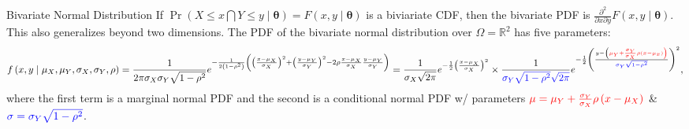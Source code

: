 \documentclass[
  ignorenonframetext,
]{beamer}
\begin{document}
\begin{frame}{Bivariate Normal Distribution}
\protect\hypertarget{bivariate-normal-distribution}{}
If
\(\Pr\left(X \leq x \bigcap Y \leq y \mid \boldsymbol{\theta}\right) = F\left(x,y\mid\boldsymbol{\theta}\right)\)
is a biviariate CDF, then the bivariate PDF is
\(\frac{\partial^2}{\partial x \partial y}F\left(x,y\mid\boldsymbol{\theta}\right)\).
This also generalizes beyond two dimensions. The PDF of the bivariate
normal distribution over \(\Omega = \mathbb{R}^2\) has five parameters:
\[f\left(x,y\mid \mu_X,\mu_Y,\sigma_X,\sigma_Y,\rho\right) =\\
\frac{1}{2\pi\sigma_X\sigma_Y\sqrt{1-\rho^2}}e^{-\frac{1}{2\left(1-\rho^2\right)}
\left(\left(\frac{x - \mu_X}{\sigma_X}\right)^2 + 
\left(\frac{y - \mu_Y}{\sigma_Y}\right)^2 - 
2\rho\frac{x - \mu_X}{\sigma_X}\frac{y - \mu_Y}{\sigma_Y}\right)} = \\
\frac{1}{\sigma_X\sqrt{2\pi}}e^{-\frac{1}{2}\left(\frac{x - \mu_X}{\sigma_X}\right)^2} \times
\frac{1}{\color{blue}{\sigma_Y\sqrt{1-\rho^2}}\sqrt{2\pi}}e^{-\frac{1}{2}
\left(\frac{y - \left(\color{red}{\mu_Y + \frac{\sigma_Y}{\sigma_X}\rho\left(x-\mu_x\right)}\right)}
{\color{blue}{\sigma_Y\sqrt{1-\rho^2}}}\right)^2},\] where the first
term is a marginal normal PDF and the second is a conditional normal PDF
w/ parameters
\(\color{red}{\mu = \mu_Y + \frac{\sigma_Y}{\sigma_X}\rho\left(x-\mu_X\right)}\)
\& \(\color{blue}{\sigma = \sigma_Y\sqrt{1-\rho^2}}\).
\end{frame}
\end{document}
